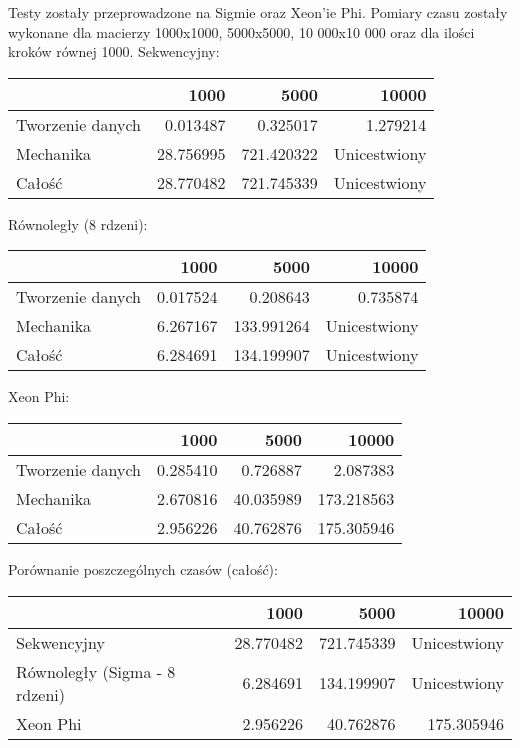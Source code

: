 \documentclass[a4paper]{article}
\begin{document}
Testy zostały przeprowadzone na Sigmie oraz Xeon'ie Phi. Pomiary czasu zostały wykonane dla macierzy 1000x1000, 5000x5000, 10 000x10 000 oraz dla ilości kroków równej 1000. \newline
Sekwencyjny: \newline
\begin{tabular}{|l|r|r|r|} \hline
& 1000 & 5000 & 10000 \\ \hline
Tworzenie danych & 0.013487 & 0.325017 & 1.279214 \\ \hline
Mechanika & 28.756995 & 721.420322 & Unicestwiony \\ \hline
Całość & 28.770482 & 721.745339 & Unicestwiony \\ \hline
\end{tabular} \newline

Równoległy (8 rdzeni): \newline
\begin{tabular}{|l|r|r|r|} \hline
& 1000 & 5000 & 10000 \\ \hline
Tworzenie danych & 0.017524 & 0.208643 & 0.735874 \\ \hline
Mechanika & 6.267167 & 133.991264 & Unicestwiony \\ \hline
Całość & 6.284691 & 134.199907 & Unicestwiony \\ \hline
\end{tabular} \newline

Xeon Phi: \newline
\begin{tabular}{|l|r|r|r|} \hline
& 1000 & 5000 & 10000 \\ \hline
Tworzenie danych & 0.285410 & 0.726887 & 2.087383 \\ \hline
Mechanika & 2.670816 & 40.035989 & 173.218563 \\ \hline
Całość & 2.956226 & 40.762876 & 175.305946 \\ \hline
\end{tabular} \newline

Porównanie poszczególnych czasów (całość): \newline
\begin{tabular}{|l|r|r|r|} \hline
& 1000 & 5000 & 10000 \\ \hline
Sekwencyjny & 28.770482 & 721.745339& Unicestwiony\\ \hline
Równoległy (Sigma - 8 rdzeni) & 6.284691 & 134.199907 & Unicestwiony \\ \hline
Xeon Phi & 2.956226 & 40.762876 & 175.305946 \\ \hline
\end{tabular} \newline
\end{document}
